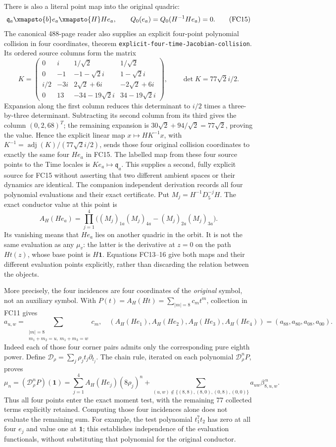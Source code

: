 There is also a literal point map into the original quadric:
\[
 \mathfrak q_a\xmapsto{b}e_a\xmapsto{H}He_a,
 \qquad Q_0(e_a)=Q_0(H^{-1}He_a)=0.
\tag{FC15}
\]
The canonical 488-page reader \cite{fullfable:ES488} also supplies an explicit
four-point polynomial collision in four coordinates, theorem
\texttt{explicit-four-time-Jacobian-collision}.
Its ordered source columns form the matrix
\[
 K=\begin{pmatrix}
 0&i&1/\sqrt2&1/\sqrt2\\
 0&-1&-1-\sqrt2 i&1-\sqrt2 i\\
 i/2&-3i&2\sqrt2+6i&-2\sqrt2+6i\\
 0&13&-34-19\sqrt2 i&34-19\sqrt2 i
 \end{pmatrix},\qquad \det K=77\sqrt2 i/2.
 \tag{FC15a}
\]
Expansion along the first column reduces this determinant to $i/2$
times a three-by-three determinant. Subtracting its second column from
its third gives the column $(0,2,68)^T$; the remaining expansion is
$30\sqrt2+94/\sqrt2=77\sqrt2$, proving the value. Hence the explicit
linear map $x\mapsto HK^{-1}x$, with
$K^{-1}=\operatorname{adj}(K)/(77\sqrt2 i/2)$, sends those four
original collision coordinates to exactly the same four $He_a$ in
FC15. The labelled map from these four source points to the Time locales
is $Ke_a\mapsto\mathfrak q_a$. This supplies a second, fully explicit
source for FC15 without asserting that two different ambient spaces or
their dynamics are identical. The companion independent derivation
records all four polynomial evaluations and their exact certificate.
Put $M_j=H^{-1}D_5^{-j}H$. The exact conductor value at this point is
\[
 A_H(He_a)=\prod_{j=1}^4
 \bigl((M_j)_{1a}(M_j)_{4a}-(M_j)_{2a}(M_j)_{3a}\bigr).
 \tag{FC16}
\]
Its vanishing means that $He_a$ lies on another quadric in the orbit.
It is not the same evaluation as any $\mu_v$: the latter is the
derivative at $z=0$ on the path $Ht(z)$, whose base point is $H\mathbf1$.
Equations FC13--16 give both maps and their different evaluation points
explicitly, rather than discarding the relation between the objects.

More precisely, the four incidences are four coordinates of the
\emph{original} symbol, not an auxiliary symbol. With
$P(t)=A_H(Ht)=\sum_{|m|=8}c_mt^m$, collection in FC11 gives
\[
 a_{u,w}=\sum_{\substack{|m|=8\\m_1+m_2=u,\ m_1+m_3=w}}c_m,
 \quad
 (A_H(He_1),A_H(He_2),A_H(He_3),A_H(He_4))
 =(a_{88},a_{80},a_{08},a_{00}).
 \tag{FC16a}
\]
Indeed each of those four corner pairs admits only the corresponding
pure eighth power. Define
$\mathcal D_\rho=\sum_j\rho_jt_j\partial_{t_j}$. The chain rule,
iterated on each polynomial $\mathcal D_\rho^nP$, proves
\[
 \mu_n=(\mathcal D_\rho^nP)(\mathbf1)
 =\sum_{j=1}^4A_H(He_j)(8\rho_j)^n
  +\sum_{(u,w)\notin\{(8,8),(8,0),(0,8),(0,0)\}}
      a_{uw}\beta_{8,u,w}^{\,n}.
 \tag{FC16b}
\]
Thus all four points enter the exact moment test, with the remaining
77 collected terms explicitly retained. Computing those four incidences
alone does not evaluate the remaining sum. For example, the test
polynomial $t_1^7t_2$ has zero at all four $e_j$ and value one at
$\mathbf1$; this establishes independence of the evaluation functionals,
without substituting that polynomial for the original conductor.

